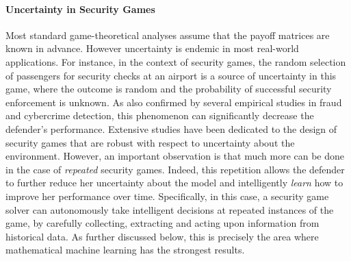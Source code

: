 
\paragraph{Uncertainty in Security Games}
Most standard game-theoretical analyses assume that the payoff matrices are known in advance.  However uncertainty is endemic in most real-world applications. 
For instance, in the context of security games, the random selection of passengers for security checks at an airport is a source of uncertainty in this game, where the outcome is random and the probability of successful security enforcement  is unknown. 
As also confirmed by several empirical studies in fraud and cybercrime detection, this phenomenon can significantly decrease the defender's performance\cite{granick2005faking, swire2009no}.
Extensive studies have been dedicated to the design of security games that are robust with respect to uncertainty about the environment\cite{aghassi2006robust,Nguyen14RO, Kiekintveld:2013}. 
However, an important observation is that much more can be done in the case of {\em repeated} security games.  
Indeed, this repetition allows the defender to further reduce her uncertainty about the model and intelligently {\em learn} how to improve her performance over time. Specifically, in this case, a security game solver can autonomously take intelligent decisions at repeated instances of the game, by carefully collecting, extracting and acting upon information from historical data. As further discussed below, this is precisely the area where mathematical machine learning has the strongest results.

%
%
